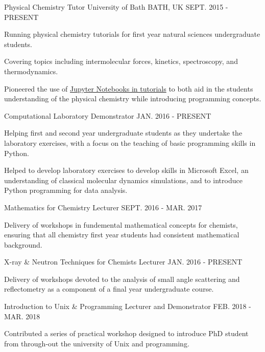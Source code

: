\begin{cventries}
	\cventry
	{Physical Chemistry Tutor}
	{University of Bath}
	{BATH, UK}
	{SEPT. 2015 - PRESENT}
	{
		\begin{cvitems}
			\item {Running physical chemistry tutorials for first year natural sciences undergraduate students.}
			\item {Covering topics including intermolecular forces, kinetics, spectroscopy, and thermodynamics.}
			\item {Pioneered the use of \href{http://people.bath.ac.uk/arm61/jupyter_tutorials/}{Jupyter Notebooks in tutorials} to both aid in the students understanding of the physical chemistry while introducing programming concepts.}
		\end{cvitems}
	}
	\cventry
	{Computational Laboratory Demonstrator}
	{}
	{}
	{JAN. 2016 - PRESENT}
	{
		\begin{cvitems}
			\item {Helping first and second year undergraduate students as they undertake the laboratory exercises, with a focus on the teaching of basic programming skills in Python.}
			\item {Helped to develop laboratory exercises to develop skills in Microsoft Excel, an understanding of classical molecular dynamics simulations, and to introduce Python programming for data analysis.}
		\end{cvitems}
	}
	\cventry
	{Mathematics for Chemistry Lecturer}
	{}
	{}
	{SEPT. 2016 - MAR. 2017}
	{
		\begin{cvitems}
			\item {Delivery of workshops in fundemental mathematical concepts for chemists, ensuring that all chemistry first year students had consistent mathematical background.}
		\end{cvitems}
	}
	\cventry
	{X-ray \& Neutron Techniques for Chemists Lecturer}
	{}
	{}
	{JAN. 2016 - PRESENT}
	{
		\begin{cvitems}
			\item {Delivery of workshops devoted to the analysis of small angle scattering and reflectometry as a component of a final year undergraduate course.}
		\end{cvitems}
	}
	\cventry
	{Introduction to Unix \& Programming Lecturer and Demonstrator}
	{}
	{}
	{FEB. 2018 - MAR. 2018}
	{
		\begin{cvitems}
			\item {Contributed a series of practical workshop designed to introduce PhD student from through-out the university of Unix and programming.}

\end{cvitems}}
\end{cventries}
